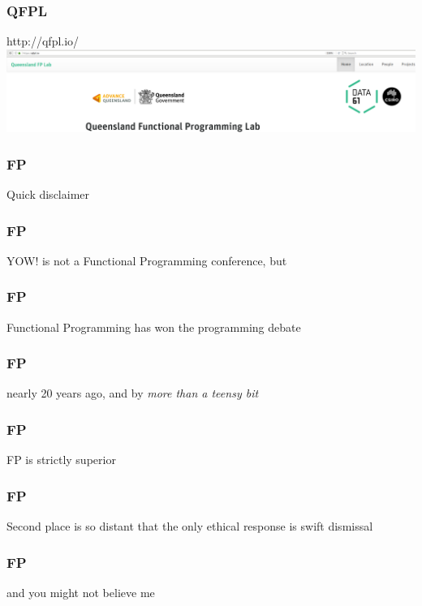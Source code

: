\begin{frame}
\frametitle{QFPL}
\begin{block}{http://qfpl.io/}
\includegraphics[height=0.24\textheight]{image/qfpl-io.png}
\end{block}
\end{frame}

\begin{frame}
\frametitle{FP}
\begin{center}
Quick disclaimer
\end{center}
\end{frame}

\begin{frame}
\frametitle{FP}
\begin{center}
YOW! is not a Functional Programming conference, but
\end{center}
\end{frame}

\begin{frame}
\frametitle{FP}
\begin{center}
Functional Programming has won the programming debate
\end{center}
\end{frame}

\begin{frame}
\frametitle{FP}
\begin{center}
nearly 20 years ago, and by \emph{more than a teensy bit}
\end{center}
\end{frame}

\begin{frame}
\frametitle{FP}
\begin{center}
FP is strictly superior
\end{center}
\end{frame}

\begin{frame}
\frametitle{FP}
\begin{center}
Second place is so distant that the only ethical response is swift dismissal
\end{center}
\end{frame}

\begin{frame}
\frametitle{FP}
\begin{center}
and you might not believe me
\end{center}
\end{frame}

